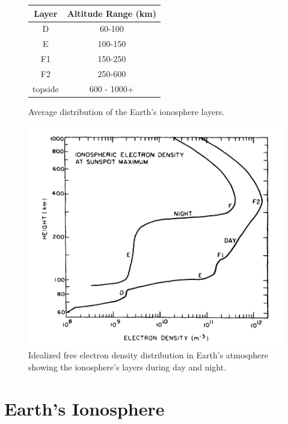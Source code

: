 \begin{figure}[htb]
\centering
\begin{minipage}[b]{0.48\textwidth}
\centering
\begin{tabular}{|c|c|}
\hline
Layer & Altitude Range (km) \\
\hline
D & 60-100 \\
\hline
E & 100-150 \\
\hline
F1 & 150-250 \\
\hline
F2 & 250-600 \\
\hline
topside & 600 - 1000+ \\
\hline
\end{tabular}
\caption{Average distribution of the Earth's ionosphere layers.}
\label{Tab:iono_layer}
\vspace{2cm}
\end{minipage}%
\begin{minipage}[b]{0.02\textwidth}
\hspace{1cm}
\end{minipage}%
\begin{minipage}[b]{0.48\textwidth}
\centering
\includegraphics[width=0.95\linewidth]{Ionosphere/figures/atmosphere_layers.jpg}
\caption{Idealized free electron density distribution in Earth's atmosphere showing the ionosphere's layers during day and night. }
\label{Fig:iono_layer}
\end{minipage}
\end{figure}



\section{Earth's Ionosphere}


